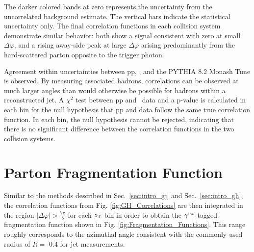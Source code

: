 
The darker colored bands at zero represents the uncertainty from the uncorrelated background estimate. The vertical bars indicate the statistical uncertainty only. The final correlation functions in each collision system demonstrate similar behavior: both show a signal consistent with zero at small $\Delta\varphi$, and a rising away-side peak at large $\Delta\varphi$ arising predominantly from the hard-scattered parton opposite to the trigger photon.

Agreement within uncertainties between pp, \pPb, and the \textsc{PYTHIA 8.2} Monash Tune is observed.
By measuring associated hadrons, correlations can be observed at much larger angles than would otherwise be possible for hadrons within a reconstructed jet. A $\chi^2$ test between pp and \pPb~data and a p-value is calculated in each \zt bin for the null hypothesis that pp and \pPb data follow the same true correlation function. In each bin, the null hypothesis cannot be rejected, indicating that there is no significant difference between the correlation functions in the two collision systems.

\section{Parton Fragmentation Function}
Similar to the methods described in Sec.~\ref{sec:intro_gj} and Sec.~\ref{sec:intro_gh}, the correlation functions from Fig. \ref{fig:GH_Correlations} are then integrated in the region $|\Delta\varphi| > \frac{7\pi}{8}$ for each $z_{\mathrm{T}}$ bin in order to obtain the $\gamma^\mathrm{iso}$-tagged fragmentation function shown in Fig. \ref{fig:Fragmentation_Functions}. This range roughly corresponds to the azimuthal angle consistent with the commonly used radius of $R=$ 0.4 for jet measurements.

